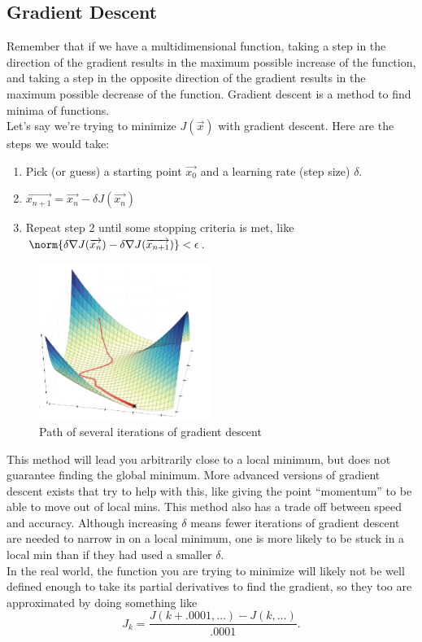\subsection{Gradient Descent}
\noindent
Remember that if we have a multidimensional function, taking a step in the direction of the gradient results in the maximum possible increase of the function, and taking a step in the opposite direction of the gradient results in the maximum possible decrease of the function.
Gradient descent is a method to find minima of functions.\\

\noindent
Let's say we're trying to minimize $J(\vec{x})$ with gradient descent. Here are the steps we would take:
\begin{enumerate}
	\item Pick (or guess) a starting point $\vec{x_0}$ and a learning rate (step size) $\delta$.
	\item $\overrightarrow{x_{n+1}} = \overrightarrow{x_n} - \delta J(\overrightarrow{x_n})$
	\item Repeat step 2 until some stopping criteria is met, like $\norm{\delta \nabla J(\overrightarrow{x_n}) - \delta \nabla J(\overrightarrow{x_{n+1}})} < \epsilon$.
\end{enumerate}

\begin{figure}[H]
	\centering
	\includegraphics[width=0.5\textwidth]{./differentialMultivariableCalculus/gradient_descent.png}
	\caption{Path of several iterations of gradient descent}
\end{figure}

\noindent
This method will lead you arbitrarily close to a local minimum, but does not guarantee finding the global minimum.
More advanced versions of gradient descent exists that try to help with this, like giving the point ``momentum'' to be able to move out of local mins.
This method also has a trade off between speed and accuracy.
Although increasing $\delta$ means fewer iterations of gradient descent are needed to narrow in on a local minimum, one is more likely to be stuck in a local min than if they had used a smaller $\delta$.\\

\noindent
In the real world, the function you are trying to minimize will likely not be well defined enough to take its partial derivatives to find the gradient, so they too are approximated by doing something like
\begin{equation*}
	J_{k} = \frac{J(k+.0001, \ldots) - J(k, \ldots)}{.0001}.
\end{equation*}